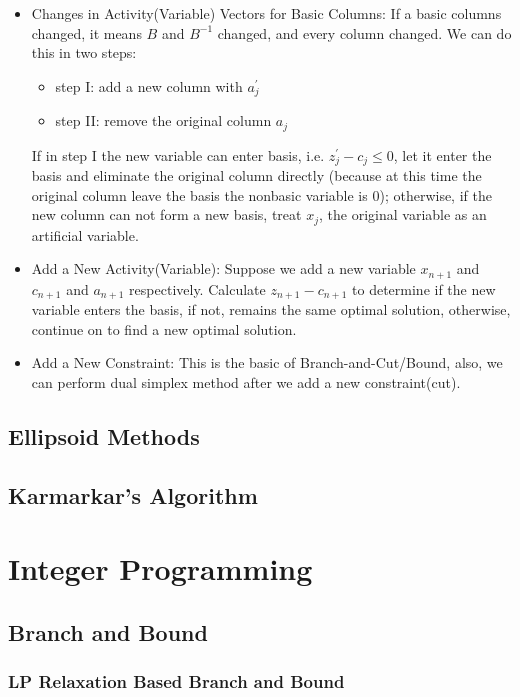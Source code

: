 \begin{itemize}
\begin{itemize}
						\item Changes in Activity(Variable) Vectors for Basic Columns: If a basic columns changed, it means $B$ and $B^{-1}$ changed, and every column changed. We can do this in two steps:
						\begin{itemize}
							\item step I: add a new column with $a_j^\prime$
							\item step II: remove the original column $a_j$
						\end{itemize}
						If in step I the new variable can enter basis, i.e. $z_j^\prime  - c_j \le 0$, let it enter the basis and eliminate the original column directly (because at this time the original column leave the basis the nonbasic variable is 0); otherwise, if the new column can not form a new basis, treat $x_j$, the original variable as an artificial variable.
						\item Add a New Activity(Variable): Suppose we add a new variable $x_{n+1}$ and $c_{n+1}$ and $a_{n+1}$ respectively. Calculate $z_{n+1} - c_{n+1}$ to determine if the new variable enters the basis, if not, remains the same optimal solution, otherwise, continue on to find a new optimal solution.
						\item Add a New Constraint: This is the basic of Branch-and-Cut/Bound, also, we can perform dual simplex method after we add a new constraint(cut).
					\end{itemize}
				\end{itemize}			

		\chapter{Ellipsoid Methods}

		\chapter{Karmarkar's Algorithm}

	\part{Integer Programming}\label{IP}
		\chapter{Branch and Bound}
			\section{LP Relaxation Based Branch and Bound}

